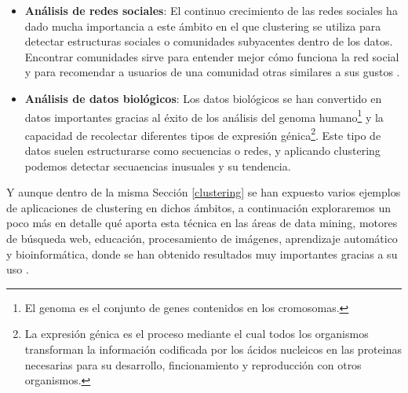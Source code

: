 \documentclass[10pt, a4paper]{article}
\begin{document}
\begin{itemize}
  \item \textbf{Análisis de redes sociales}: El continuo crecimiento de las redes sociales ha dado mucha importancia a este ámbito en el que clustering se utiliza para detectar estructuras sociales o comunidades subyacentes dentro de los datos. Encontrar comunidades sirve para entender mejor cómo funciona la red social y para recomendar a usuarios de una comunidad otras similares a sus gustos \cite{11}.
  
  \item \textbf{Análisis de datos biológicos}: Los datos biológicos se han convertido en datos importantes gracias al éxito de los análisis del genoma humano\footnote{El genoma es el conjunto de genes contenidos en los cromosomas.} y la capacidad de recolectar diferentes tipos de expresión génica\footnote{La expresión génica es el proceso mediante el cual todos los organismos transforman la información codificada por los ácidos nucleicos en las proteinas necesarias para su desarrollo, fincionamiento y reproducción con otros organismos.}. Este tipo de datos suelen estructurarse como secuencias o redes, y aplicando clustering podemos detectar secuaencias inusuales y su tendencia. 
\end{itemize}


Y aunque dentro de la misma Sección \ref{clustering} se han expuesto varios ejemplos de aplicaciones de clustering en dichos ámbitos, a continuación exploraremos un poco más en detalle qué aporta esta técnica en las áreas de data mining, motores de búsqueda web, educación, procesamiento de imágenes, aprendizaje automático y bioinformática, donde se han obtenido resultados muy importantes gracias a su uso \cite{articulo14}.




\clearpage
\end{document}
